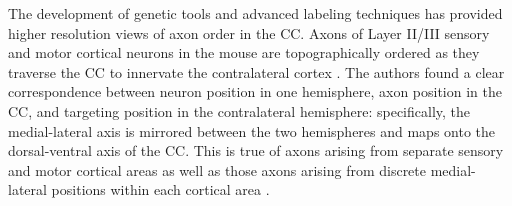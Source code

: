 The development of genetic tools and advanced labeling techniques has provided higher resolution views of axon order in the CC. 
Axons of Layer II/III sensory and motor cortical neurons in the mouse are topographically ordered as they traverse the CC to innervate the contralateral cortex \cite{zhou2013axon}. 
The authors found a clear correspondence between neuron position in one hemisphere, axon position in the CC, and targeting position in the contralateral hemisphere: specifically, the medial-lateral axis is mirrored between the two hemispheres and maps onto the dorsal-ventral axis of the CC. 
This is true of axons arising from separate sensory and motor cortical areas as well as those axons arising from discrete medial-lateral positions within each cortical area \cite{zhou2013axon}. 

